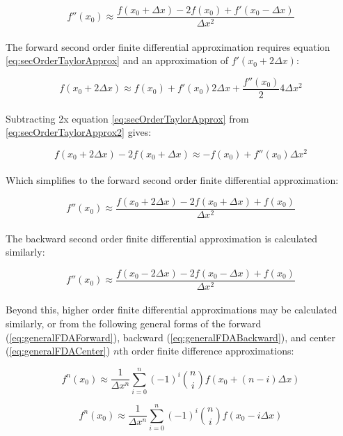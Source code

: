 {   \begin{equation}
   f''(x_{0}) \approx \frac{f(x_{0} + \Delta  x) - 2f(x_{0}) + f'(x_{0} -\Delta  x)}{\Delta  x^{2}}
  \end{equation}
    \\
  The forward second order finite differential approximation requires equation \ref{eq:secOrderTaylorApprox} and an approximation of $f'(x_{0} + 2\Delta  x)$:
  
  \begin{equation}\label{eq:secOrderTaylorApprox2}
  f(x_{0} + 2\Delta  x) \approx f(x_{0}) + f'(x_{0})2\Delta  x + \frac{f''(x_{0})}{2}4\Delta  x^{2}
  \end{equation}
    \\
  Subtracting 2x equation \ref{eq:secOrderTaylorApprox} from \ref{eq:secOrderTaylorApprox2} gives:
  
    \begin{equation}
  f(x_{0} + 2\Delta  x) - 2f(x_{0} + \Delta  x) \approx -f(x_{0}) + f''(x_{0})\Delta  x^{2}
  \end{equation}
  \\
Which simplifies to the forward second order finite differential approximation:
  
      \begin{equation}
f''(x_{0}) \approx \frac{f(x_{0} + 2\Delta  x) - 2f(x_{0} + \Delta  x) + f(x_{0})}{\Delta  x^{2}}
  \end{equation}
  \\
  The backward second order finite differential approximation is calculated similarly:
  
        \begin{equation}
f''(x_{0}) \approx \frac{f(x_{0} - 2\Delta  x) - 2f(x_{0} - \Delta  x) + f(x_{0})}{\Delta  x^{2}}
  \end{equation}
  \\
 Beyond this, higher order finite differential approximations may be calculated similarly, or from the following general forms of the forward (\ref{eq:generalFDAForward}), backward (\ref{eq:generalFDABackward}), and center (\ref{eq:generalFDACenter}) $n$th order finite difference approximations:
 
  \begin{equation}\label{eq:generalFDAForward}
 f^{n}(x_{0}) \approx \frac{1}{\Delta  x^{n}}\sum_{i=0}^{n}(-1)^{i}\binom {n} {i}f(x_{0} + (n-i)\Delta  x)
 \end{equation}
 
 \begin{equation}\label{eq:generalFDABackward}
 f^{n}(x_{0}) \approx \frac{1}{\Delta  x^{n}}\sum_{i=0}^{n}(-1)^{i}\binom {n} {i}f(x_{0} - i\Delta  x)
 \end{equation}
 
}
